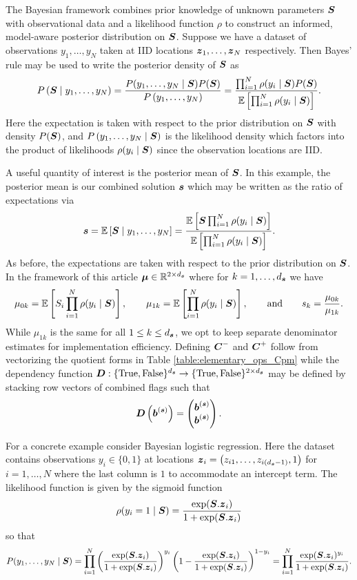 \documentclass{article}[12pt]
\begin{document}
The Bayesian framework combines prior knowledge of unknown parameters $\boldsymbol{S}$ with observational data and a likelihood function $\rho$ to construct an informed, model-aware posterior distribution on $\boldsymbol{S}$. Suppose we have a dataset of observations $y_1,\dots,y_{N}$ taken at IID locations $\boldsymbol{z}_1,\dots,\boldsymbol{z}_{N}$ respectively. Then Bayes' rule may be used to write the posterior density of $\boldsymbol{S}$ as 
$$P\left(\boldsymbol{S} \mid y_1,\dots,y_{N}\right) = \frac{P(y_1,\dots,y_{N} \mid \boldsymbol{S}) P(\boldsymbol{S})}{P\left(y_1,\dots,y_{N}\right)} = \frac{\prod_{i=1}^{N} \rho(y_i \mid \boldsymbol{S}) P(\boldsymbol{S})}{\mathbb{E}\left[\prod_{i=1}^{N} \rho(y_i \mid \boldsymbol{S})\right]}.$$
Here the expectation is taken with respect to the prior distribution on $\boldsymbol{S}$ with density $P(\boldsymbol{S})$, and $P\left(y_1,\dots,y_{N} \mid \boldsymbol{S} \right)$ is the likelihood density which factors into the product of likelihoods $\rho(y_i \mid \boldsymbol{S})$ since the observation locations are IID. 

A useful quantity of interest is the posterior mean of $\boldsymbol{S}$. In this example, the posterior mean is our combined solution $\boldsymbol{s}$ which may be written as the ratio of expectations via
$$\boldsymbol{s} = \mathbb{E}\left[\boldsymbol{S} \mid y_1,\dots,y_{N}\right] = \frac{\mathbb{E}\left[\boldsymbol{S} \prod_{i=1}^{N} \rho(y_i \mid \boldsymbol{S})\right]}{\mathbb{E}\left[\prod_{i=1}^{N} \rho(y_i \mid \boldsymbol{S})\right]}.$$
As before, the expectations are taken with respect to the prior distribution on $\boldsymbol{S}$. In the framework of this article $\boldsymbol{\mu} \in \mathbb{R}^{2 \times d_{\boldsymbol{s}}}$ where for $k=1,\dots,d_{\boldsymbol{s}}$ we have 
$$\mu_{0k} = \mathbb{E}\left[S_i \prod_{i=1}^{N} \rho(y_i \mid \boldsymbol{S})\right], \qquad \mu_{1k} = \mathbb{E}\left[\prod_{i=1}^{N} \rho(y_i \mid \boldsymbol{S})\right], \qquad \text{and} \qquad s_k = \frac{\mu_{0k}}{\mu_{1k}}.$$
While $\mu_{1k}$ is the same for all $1 \leq k \leq d_{\boldsymbol{s}}$, we opt to keep separate denominator estimates for implementation efficiency. Defining $\boldsymbol{C}^-$ and $\boldsymbol{C}^+$ follow from vectorizing the quotient forms in Table \ref{table:elementary_ops_Cpm} while the dependency function $\boldsymbol{D}: \{\text{True},\text{False}\}^{d_{\boldsymbol{s}}} \to \{\text{True},\text{False}\}^{2 \times d_{\boldsymbol{s}}}$ may be defined by stacking row vectors of combined flags such that
$$\boldsymbol{D}\left(\boldsymbol{b}^{(\boldsymbol{s})}\right) = \begin{pmatrix} \boldsymbol{b}^{(\boldsymbol{s})} \\ \boldsymbol{b}^{(\boldsymbol{s})} \end{pmatrix}.$$

For a concrete example consider Bayesian logistic regression. Here the dataset contains observations $y_i \in \{0,1\}$ at locations $\boldsymbol{z}_i = \left(z_{i1},\dots,z_{i(d_{\boldsymbol{s}}-1)},1\right)$ for $i=1,\dots,N$ where the last column is $1$ to accommodate an intercept term. The likelihood function is given by the sigmoid function
$$\rho(y_i = 1 \mid \boldsymbol{S}) = \frac{\exp(\boldsymbol{S}.\boldsymbol{z}_i)}{1+\exp(\boldsymbol{S}.\boldsymbol{z}_i)}$$
so that
$$P(y_1,\dots,y_N \mid \boldsymbol{S}) = \prod_{i=1}^N \left(\frac{\exp(\boldsymbol{S}.\boldsymbol{z}_i)}{1+\exp(\boldsymbol{S}.\boldsymbol{z}_i)}\right)^{y_i} \left(1-\frac{\exp(\boldsymbol{S}.\boldsymbol{z}_i)}{1+\exp(\boldsymbol{S}.\boldsymbol{z}_i)}\right)^{1-y_i} = \prod_{i=1}^N \frac{\exp(\boldsymbol{S}.\boldsymbol{z}_i)^{y_i}}{1+\exp(\boldsymbol{S}.\boldsymbol{z}_i)}.$$
\end{document}
